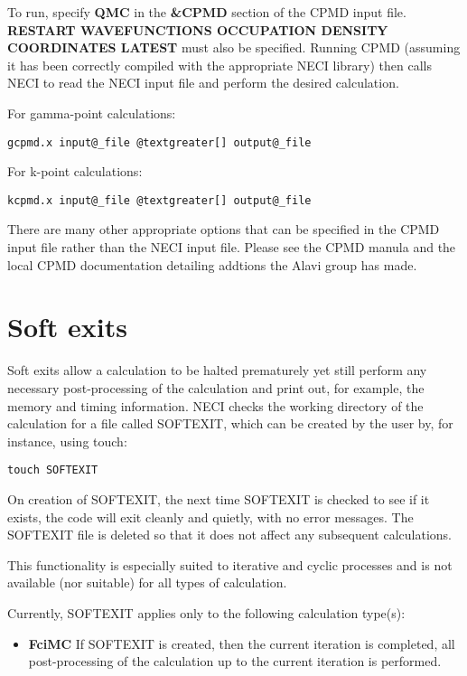 \documentclass[openany,a4paper,10pt,english]{manual}
\begin{document}
To run, specify \textbf{QMC} in the \textbf{\&CPMD} section of the CPMD input file.
\textbf{RESTART WAVEFUNCTIONS OCCUPATION DENSITY COORDINATES LATEST} must
also be specified.  Running CPMD (assuming it has been correctly compiled
with the appropriate NECI library) then calls NECI to read the NECI
input file and perform the desired calculation.

For gamma-point calculations:

\begin{Verbatim}[commandchars=@\[\]]
gcpmd.x input@_file @textgreater[] output@_file
\end{Verbatim}

For k-point calculations:

\begin{Verbatim}[commandchars=@\[\]]
kcpmd.x input@_file @textgreater[] output@_file
\end{Verbatim}

There are many other appropriate options that can be specified in the
CPMD input file rather than the NECI input file.  Please see the CPMD
manula and the local CPMD documentation detailing addtions the Alavi
group has made.


\section{Soft exits}

Soft exits allow a calculation to be halted prematurely yet still
perform any necessary post-processing of the calculation and print out,
for example, the memory and timing information.  NECI checks the working
directory of the calculation for a file called SOFTEXIT, which can be
created by the user by, for instance, using touch:

\begin{Verbatim}[commandchars=@\[\]]
touch SOFTEXIT
\end{Verbatim}

On creation of SOFTEXIT, the next time SOFTEXIT is checked to see
if it exists, the code will exit cleanly and quietly, with no error
messages.  The SOFTEXIT file is deleted so that it does not affect
any subsequent calculations.

This functionality is especially suited to iterative and cyclic
processes and is not available (nor suitable) for all types of
calculation.

Currently, SOFTEXIT applies only to the following calculation
type(s):
\begin{itemize}
\item {} 
\textbf{FciMC}
If SOFTEXIT is created, then the current iteration is completed,
all post-processing of the calculation up to the current iteration
is performed.

\end{itemize}
\end{document}
